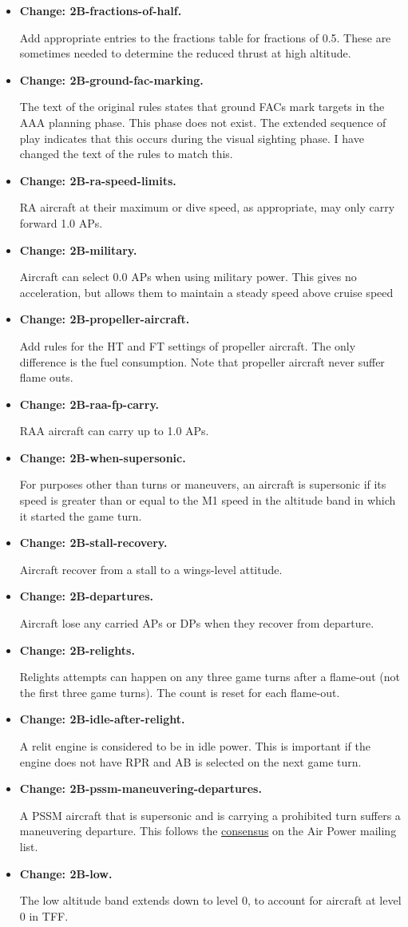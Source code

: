 \documentclass[10pt]{report}
\newcommand{\itemtag}[1]{\item \textbf{Change: #1.}\par}
\begin{document}
\begin{itemize}
    \itemtag{2B-fractions-of-half} Add appropriate entries to the fractions table for fractions of 0.5. These are sometimes needed to determine the reduced thrust at high altitude.

    \itemtag{2B-ground-fac-marking} The text of the original rules states that ground FACs mark targets in the AAA planning phase. This phase does not exist. The extended sequence of play indicates that this occurs during the visual sighting phase. I have changed the text of the rules to match this.

    \itemtag{2B-ra-speed-limits} RA aircraft at their maximum or dive speed, as appropriate, may only carry forward 1.0 APs.

    \itemtag{2B-military} Aircraft can select 0.0 APs when using military power. This gives no acceleration, but allows them to maintain a steady speed above cruise speed
    
    \itemtag{2B-propeller-aircraft} Add rules for the HT and FT settings of propeller aircraft. The only difference is the fuel consumption. Note that propeller aircraft never suffer flame outs.
    
    \itemtag{2B-raa-fp-carry}{RAA aircraft can carry up to 1.0 APs.}
    
    \itemtag{2B-when-supersonic} For purposes other than turns or maneuvers, an aircraft is supersonic if its speed is greater than or equal to the M1 speed in the altitude band in which it started the game turn.

    \itemtag{2B-stall-recovery} Aircraft recover from a stall to a wings-level attitude.

    \itemtag{2B-departures} Aircraft lose any carried APs or DPs when they recover from departure.
    
    \itemtag{2B-relights} Relights attempts can happen on any three game turns after a flame-out (not the first three game turns). The count is reset for each flame-out.

    \itemtag{2B-idle-after-relight} A relit engine is considered to be in idle power. This is important if the engine does not have RPR and AB is selected on the next game turn.
    
    \itemtag{2B-pssm-maneuvering-departures} A PSSM aircraft that is supersonic and is carrying a prohibited turn suffers a maneuvering departure. This follows the \href{https://airpower.groups.io/g/main/message/2519}{consensus} on the Air Power mailing list.

    \itemtag{2B-low} The low altitude band extends down to level 0, to account for aircraft at level 0 in TFF.


\end{itemize}
\end{document}
